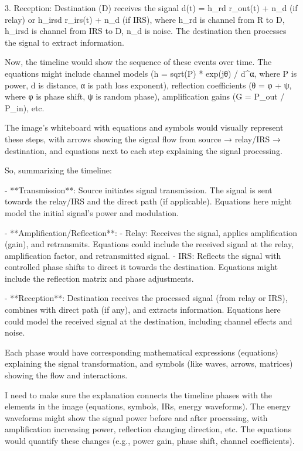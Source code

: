 3. Reception: Destination (D) receives the signal d(t) = h_rd r_out(t) + n_d (if relay) or h_irsd r_irs(t) + n_d (if IRS), where h_rd is channel from R to D, h_irsd is channel from IRS to D, n_d is noise. The destination then processes the signal to extract information.

Now, the timeline would show the sequence of these events over time. The equations might include channel models (h = sqrt(P) * exp(jθ) / d^α, where P is power, d is distance, α is path loss exponent), reflection coefficients (θ = φ + ψ, where φ is phase shift, ψ is random phase), amplification gains (G = P_out / P_in), etc.

The image's whiteboard with equations and symbols would visually represent these steps, with arrows showing the signal flow from source → relay/IRS → destination, and equations next to each step explaining the signal processing.

So, summarizing the timeline:

- **Transmission**: Source initiates signal transmission. The signal is sent towards the relay/IRS and the direct path (if applicable). Equations here might model the initial signal's power and modulation.

- **Amplification/Reflection**: 
  - Relay: Receives the signal, applies amplification (gain), and retransmits. Equations could include the received signal at the relay, amplification factor, and retransmitted signal.
  - IRS: Reflects the signal with controlled phase shifts to direct it towards the destination. Equations might include the reflection matrix and phase adjustments.

- **Reception**: Destination receives the processed signal (from relay or IRS), combines with direct path (if any), and extracts information. Equations here could model the received signal at the destination, including channel effects and noise.

Each phase would have corresponding mathematical expressions (equations) explaining the signal transformation, and symbols (like waves, arrows, matrices) showing the flow and interactions.

I need to make sure the explanation connects the timeline phases with the elements in the image (equations, symbols, IRs, energy waveforms). The energy waveforms might show the signal power before and after processing, with amplification increasing power, reflection changing direction, etc. The equations would quantify these changes (e.g., power gain, phase shift, channel coefficients).

